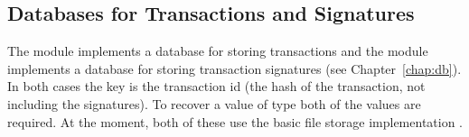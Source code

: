 \subsection{Databases for Transactions and Signatures}

The module {} implements a database for storing transactions
and the module {} implements a database for storing
transaction signatures
(see Chapter~\ref{chap:db}).
In both cases the key is the transaction id (the hash of the transaction,
not including the signatures).
To recover a value of type {} both of the values are required.
At the moment, both of these use the basic file storage implementation {}.

